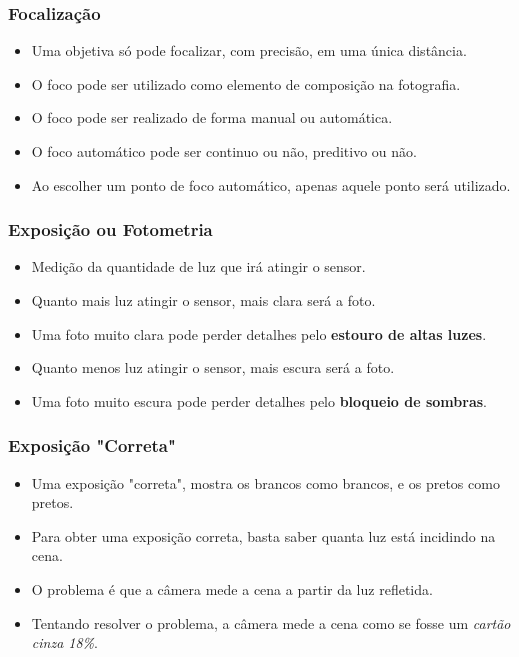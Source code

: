 
\begin{frame}
    \frametitle{Focalização}
    \begin{itemize}
        \item Uma objetiva só pode focalizar, com precisão, em uma única distância.
        \item O foco pode ser utilizado como elemento de composição na fotografia.
        \item O foco pode ser realizado de forma manual ou automática.
        \item O foco automático pode ser continuo ou não, preditivo ou não.
        \item Ao escolher um ponto de foco automático, apenas aquele ponto será utilizado.
    \end{itemize}
\end{frame}

\begin{frame}
    \frametitle{Exposição ou Fotometria}
    \begin{itemize}
        \item Medição da quantidade de luz que irá atingir o sensor.
        \item Quanto mais luz atingir o sensor, mais clara será a foto.
        \item Uma foto muito clara pode perder detalhes pelo \textbf{estouro de altas luzes}.
        \item Quanto menos luz atingir o sensor, mais escura será a foto.
        \item Uma foto muito escura pode perder detalhes pelo \textbf{bloqueio de sombras}.
    \end{itemize}
\end{frame}

\begin{frame}
    \frametitle{Exposição "Correta"}

    \begin{itemize}
        \item Uma exposição "correta", mostra os brancos como brancos, e os pretos como pretos.
        \item Para obter uma exposição correta, basta saber quanta luz está incidindo na cena.
        \item O problema é que a câmera mede a cena a partir da luz refletida.
        \item Tentando resolver o problema, a câmera mede a cena como se fosse um \textit{cartão cinza 18\%}.
    \end{itemize}
\end{frame}

